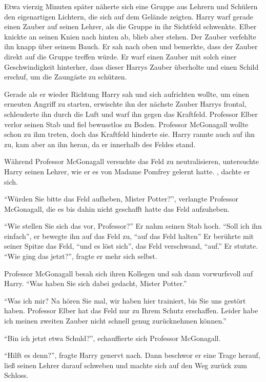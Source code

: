 Etwa vierzig Minuten später näherte sich eine Gruppe aus Lehrern und Schülern den eigenartigen Lichtern, die sich auf dem Gelände zeigten. Harry warf gerade einen Zauber auf seinen Lehrer, als die Gruppe in ihr Sichtfeld schwenkte. Elber knickte an seinen Knien nach hinten ab, blieb aber stehen. Der Zauber verfehlte ihn knapp über seinem Bauch. Er sah nach oben und bemerkte, dass der Zauber direkt auf die Gruppe treffen würde. Er warf einen Zauber mit solch einer Geschwindigkeit hinterher, dass dieser Harrys Zauber überholte und einen Schild erschuf, um die Zaungäste zu schützen.

Gerade als er wieder Richtung Harry sah und sich aufrichten wollte, um einen erneuten Angriff zu starten, erwischte ihn der nächste Zauber Harrys frontal, schleuderte ihn durch die Luft und warf ihn gegen das Kraftfeld. Professor Elber verlor seinen Stab und fiel bewusstlos zu Boden. Professor McGonagall wollte schon zu ihm treten, doch das Kraftfeld hinderte sie. Harry rannte auch auf ihn zu, kam aber an ihn heran, da er innerhalb des Feldes stand.

Während Professor McGonagall versuchte das Feld zu neutralisieren, untersuchte Harry seinen Lehrer, wie er es von Madame Pomfrey gelernt hatte. , dachte er sich.

\enquote{Würden Sie bitte das Feld aufheben, Mister Potter?}, verlangte Professor McGonagall, die es bis dahin nicht geschafft hatte das Feld aufzuheben.

\enquote{Wie stellen Sie sich das vor, Professor?} Er nahm seinen Stab hoch. \enquote{Soll ich ihn einfach\abs}, er bewegte ihn auf das Feld zu, \enquote{\aabs auf das Feld halten\abs} Er berührte mit seiner Spitze das Feld, \enquote{\aabs und es löst sich\abs}, das Feld verschwand, \enquote{\aabs auf.} Er stutzte. \enquote{Wie ging das jetzt?}, fragte er mehr sich selbst.

Professor McGonagall besah sich ihren Kollegen und sah dann vorwurfsvoll auf Harry. \enquote{Was haben Sie sich dabei gedacht, Mister Potter.}

\enquote{Was ich mir\abs? Na hören Sie mal, wir haben hier trainiert, bis Sie uns gestört haben. Professor Elber hat das Feld nur zu Ihrem Schutz erschaffen. Leider habe ich meinen zweiten Zauber nicht schnell genug zurücknehmen können.}

\enquote{Bin ich jetzt etwa Schuld?}, echauffierte sich Professor McGonagall.

\enquote{Hilft es denn?}, fragte Harry genervt nach. Dann beschwor er eine Trage herauf, ließ seinen Lehrer darauf schweben und machte sich auf den Weg zurück zum Schloss.


